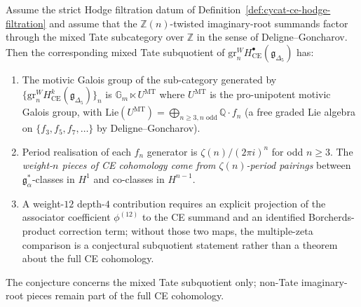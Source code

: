 \begin{conjecture}
\label{thm:cycat-ce-mixed-tate}
\ClaimStatusConjectured
Assume the strict Hodge filtration datum of
Definition~\textup{\ref{def:cycat-ce-hodge-filtration}} and assume that
the $\mathbb{Z}(n)$-twisted imaginary-root summands factor through the
mixed Tate subcategory over $\mathbb{Z}$ in the sense of
Deligne--Goncharov. Then the corresponding mixed Tate subquotient of
$\mathrm{gr}^W_n H^\bullet_{\mathrm{CE}}(\mathfrak{g}_{\Delta_5})$ has:
\begin{enumerate}[label=(\alph*)]
 \item The motivic Galois group of the sub-category generated by
 $\{\mathrm{gr}^W_n H^k_{\mathrm{CE}}(\mathfrak{g}_{\Delta_5})\}_n$ is
 $\mathbb{G}_m \ltimes U^{\mathrm{MT}}$ where $U^{\mathrm{MT}}$ is
 the pro-unipotent motivic Galois group, with $\mathrm{Lie}(U^{\mathrm{MT}})
 = \bigoplus_{n \geq 3, n\text{ odd}}\mathbb{Q}\cdot f_n$ (a free graded
 Lie algebra on $\{f_3, f_5, f_7, \ldots\}$ by Deligne--Goncharov).
 \item Period realisation of each $f_n$ generator is $\zeta(n)/
 (2\pi i)^n$ for odd $n \geq 3$. The \emph{weight-$n$ pieces of CE
 cohomology come from $\zeta(n)$-period pairings} between
 $\mathfrak{g}_\alpha^*$-classes in $H^1$ and co-classes in $H^{n-1}$.
 \item A weight-$12$ depth-$4$ contribution requires an explicit
 projection of the associator coefficient $\phi^{(12)}$ to the CE
 summand and an identified Borcherds-product correction term; without
 those two maps, the multiple-zeta comparison is a conjectural
 subquotient statement rather than a theorem about the full CE
 cohomology.
\end{enumerate}
The conjecture concerns the mixed Tate subquotient only; non-Tate
imaginary-root pieces remain part of the full CE cohomology.
\end{conjecture}

